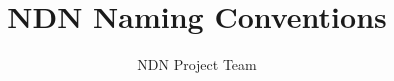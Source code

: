 \documentclass[10pt]{article}
\begin{document}
\title{NDN Naming Conventions}
\author{NDN Project Team}
\maketitle





\end{document}
